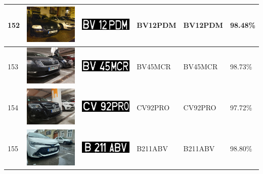 \documentclass[a4paper,12pt]{report}
\begin{document}
\begin{longtable}{| m{0.6cm} | m{3cm} | m{3cm} | m{1.8cm} | m{1.8cm} | m{1.8cm} |}
    152 & \includegraphics[width=3cm,keepaspectratio]{dataset/89_s1.jpg}  & \includegraphics[width=3cm,keepaspectratio]{segmentari/152.jpg} & BV12PDM             & BV12PDM              & 98.48\%    \\ \hline
    153 & \includegraphics[width=3cm,keepaspectratio]{dataset/90_s1.jpg}  & \includegraphics[width=3cm,keepaspectratio]{segmentari/153.jpg} & BV45MCR             & BV45MCR              & 98.73\%    \\ \hline
    154 & \includegraphics[width=3cm,keepaspectratio]{dataset/91_s1.jpg}  & \includegraphics[width=3cm,keepaspectratio]{segmentari/154.jpg} & CV92PRO             & CV92PRO              & 97.72\%    \\ \hline
    155 & \includegraphics[width=3cm,keepaspectratio]{dataset/92_s1.jpg}  & \includegraphics[width=3cm,keepaspectratio]{segmentari/155.jpg} & B211ABV             & B211ABV              & 98.80\%    \\ \hline

\end{longtable}
\end{document}
